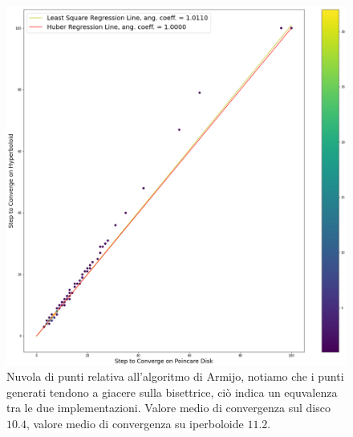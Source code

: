 \documentclass[a4paper, 12pt]{article}
\begin{document}
\begin{figure}[H] %
    \centering\includegraphics[width=1\textwidth]{armijo.png}
    \caption{Nuvola di punti relativa all'algoritmo di Armijo, notiamo che i punti generati tendono a giacere sulla bisettrice, ciò indica un equvalenza tra le due implementazioni. Valore medio di convergenza sul disco $10.4$, valore medio di convergenza su iperboloide $11.2$.}
\end{figure}
\end{document}
